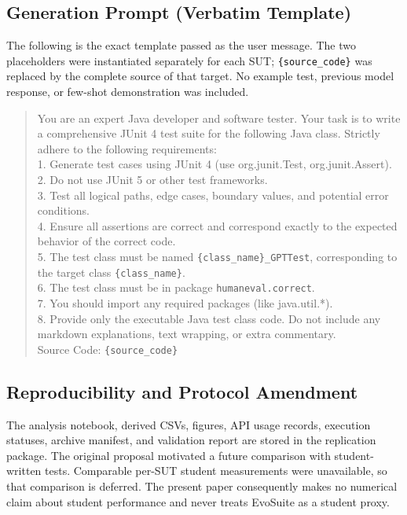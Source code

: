 ﻿\documentclass[conference]{IEEEtran}
\begin{document}
\subsection{Generation Prompt (Verbatim Template)}
\label{sec:prompt}
The following is the exact template passed as the user message. The two placeholders were instantiated separately for each SUT; \texttt{\{source\_code\}} was replaced by the complete source of that target. No example test, previous model response, or few-shot demonstration was included.

\begin{quote}\footnotesize
You are an expert Java developer and software tester. Your task is to write a comprehensive JUnit 4 test suite for the following Java class. Strictly adhere to the following requirements:\\
1. Generate test cases using JUnit 4 (use org.junit.Test, org.junit.Assert).\\
2. Do not use JUnit 5 or other test frameworks.\\
3. Test all logical paths, edge cases, boundary values, and potential error conditions.\\
4. Ensure all assertions are correct and correspond exactly to the expected behavior of the correct code.\\
5. The test class must be named \texttt{\{class\_name\}\_GPTTest}, corresponding to the target class \texttt{\{class\_name\}}.\\
6. The test class must be in package \texttt{humaneval.correct}.\\
7. You should import any required packages (like java.util.*).\\
8. Provide only the executable Java test class code. Do not include any markdown explanations, text wrapping, or extra commentary.\\
Source Code: \texttt{\{source\_code\}}
\end{quote}

\subsection{Reproducibility and Protocol Amendment}
The analysis notebook, derived CSVs, figures, API usage records, execution statuses, archive manifest, and validation report are stored in the replication package. The original proposal motivated a future comparison with student-written tests. Comparable per-SUT student measurements were unavailable, so that comparison is deferred. The present paper consequently makes no numerical claim about student performance and never treats EvoSuite as a student proxy.
\end{document}
